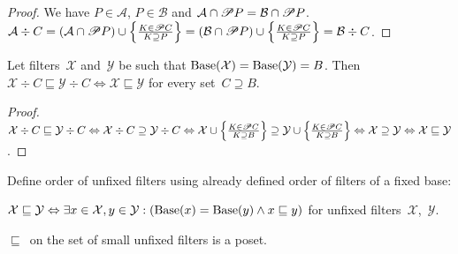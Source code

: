 \begin{proof}
We have $P\in\mathcal{A}$, $P\in\mathcal{B}$ and
$\mathcal{A}\cap\mathscr{P} P=\mathcal{B}\cap\mathscr{P} P$.
$\mathcal{A}\div C =
(\mathcal{A}\cap\mathscr{P} P)\cup\left\{ \frac{K\in\mathscr{P} C}{K\supseteq P}\right\} =
(\mathcal{B}\cap\mathscr{P} P)\cup\left\{ \frac{K\in\mathscr{P} C}{K\supseteq P}\right\} =
\mathcal{B}\div C$.
\end{proof}

\begin{lem}
Let filters~$\mathcal{X}$
and~$\mathcal{Y}$ be such that
$\operatorname{Base}(\mathcal{X})=\operatorname{Base}(\mathcal{Y})=B$. Then
$\mathcal{X}\div C\sqsubseteq\mathcal{Y}\div C
\Leftrightarrow \mathcal{X}\sqsubseteq\mathcal{Y}$ for every
set~$C\supseteq B$.
\end{lem}

\begin{proof}
$\mathcal{X}\div C\sqsubseteq\mathcal{Y}\div C\Leftrightarrow
\mathcal{X}\div C\supseteq\mathcal{Y}\div C\Leftrightarrow
\mathcal{X}\cup\left\{ \frac{K\in\mathscr{P} C}{K\supseteq B}\right\} \supseteq \mathcal{Y}\cup\left\{ \frac{K\in\mathscr{P} C}{K\supseteq B}\right\} \Leftrightarrow
\mathcal{X}\supseteq\mathcal{Y} \Leftrightarrow
\mathcal{X}\sqsubseteq\mathcal{Y}$.
\end{proof}

Define order of unfixed filters using already defined order
of filters of a fixed base:

\begin{defn}
$\mathcal{X}\sqsubseteq\mathcal{Y} \Leftrightarrow
\exists x\in\mathcal{X},y\in\mathcal{Y}:
(\operatorname{Base}(x)=\operatorname{Base}(y)\land x\sqsubseteq y)$ for unfixed
filters~$\mathcal{X}$,~$\mathcal{Y}$.
\end{defn}

\begin{thm}
$\sqsubseteq$~on the set of small unfixed filters is a poset.
\end{thm}

